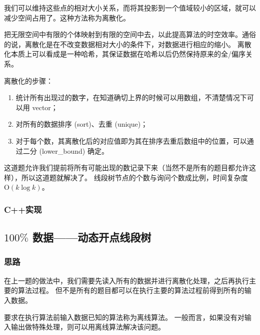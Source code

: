 我们可以维持这些点的相对大小关系，而将其投影到一个值域较小的区域，就可以减少空间占用了。这种方法称为离散化。

\begin{definition}[离散化] \label{def:discretization}
    \hspace{2em}把无限空间中有限的个体映射到有限的空间中去，以此提高算法的时空效率。通俗的说，离散化是在不改变数据相对大小的条件下，对数据进行相应的缩小。
    离散化本质上可以看成是一种哈希，其保证数据在哈希以后仍然保持原来的全/偏序关系。

    \hspace{2em}离散化的步骤：
    \begin{enumerate}
        \item 统计所有出现过的数字，在知道确切上界的时候可以用数组，不清楚情况下可以用 vector；
        \item 对所有的数据排序 (sort)、去重 (unique)；
        \item 对于每个数，其离散化后的对应值即为其在排序去重后数组中的位置，可以通过二分 (lower\_bound) 确定。
    \end{enumerate}

\end{definition}

这道题允许我们提前将所有可能出现的数记录下来（当然不是所有的题目都允许这样），所以这道题就解决了。
线段树节点的个数与询问个数成比例，时间复杂度 $\mathrm{O}(k\log k)$。

\subsubsection{C++实现}



\subsection{$100\%$ 数据——动态开点线段树}

\subsubsection{思路}

在上一题的做法中，我们需要先读入所有的数据并进行离散化处理，之后再执行主要的算法过程。
但不是所有的题目都可以在执行主要的算法过程前得到所有的输入数据。

\begin{definition}[离线算法] \label{def:offline algorithm}
    \hspace{2em}要求在执行算法前输入数据已知的算法称为离线算法。
    一般而言，如果没有对输入输出做特殊处理，则可以用离线算法解决该问题。
\end{definition}


